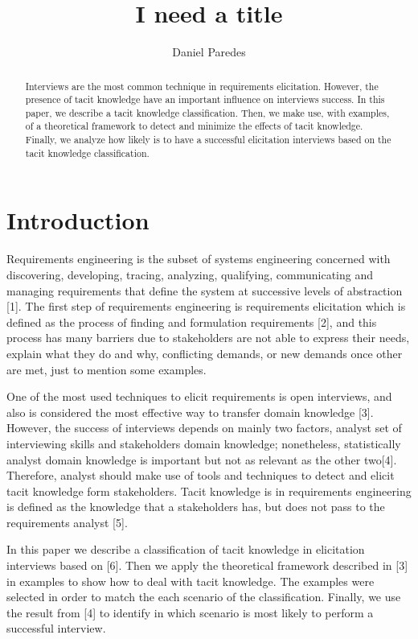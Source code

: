 \documentclass[]{llncs}
\institute{FH Dortmund, \\ \texttt{}}
\title{I need a title}
\author{Daniel Paredes}
\date{}
\begin{document}
\maketitle
\begin{abstract}
Interviews are the most common technique in requirements elicitation.
However, the presence of tacit knowledge have an important influence on
interviews success. In this paper, we describe a tacit knowledge
classification. Then, we make use, with examples, of a theoretical
framework to detect and minimize the effects of tacit knowledge.
Finally, we analyze how likely is to have a successful elicitation
interviews based on the tacit knowledge classification.


\end{abstract}

\hypertarget{introduction}{%
\section{Introduction}\label{introduction}}

Requirements engineering is the subset of systems engineering concerned
with discovering, developing, tracing, analyzing, qualifying,
communicating and managing requirements that define the system at
successive levels of abstraction {[}1{]}. The first step of requirements
engineering is requirements elicitation which is defined as the process
of finding and formulation requirements {[}2{]}, and this process has
many barriers due to stakeholders are not able to express their needs,
explain what they do and why, conflicting demands, or new demands once
other are met, just to mention some examples.

One of the most used techniques to elicit requirements is open
interviews, and also is considered the most effective way to transfer
domain knowledge {[}3{]}. However, the success of interviews depends on
mainly two factors, analyst set of interviewing skills and stakeholders
domain knowledge; nonetheless, statistically analyst domain knowledge is
important but not as relevant as the other two{[}4{]}. Therefore,
analyst should make use of tools and techniques to detect and elicit
tacit knowledge form stakeholders. Tacit knowledge is in requirements
engineering is defined as the knowledge that a stakeholders has, but
does not pass to the requirements analyst {[}5{]}.

In this paper we describe a classification of tacit knowledge in
elicitation interviews based on {[}6{]}. Then we apply the theoretical
framework described in {[}3{]} in examples to show how to deal with
tacit knowledge. The examples were selected in order to match the each
scenario of the classification. Finally, we use the result from {[}4{]}
to identify in which scenario is most likely to perform a successful
interview.
\end{document}
